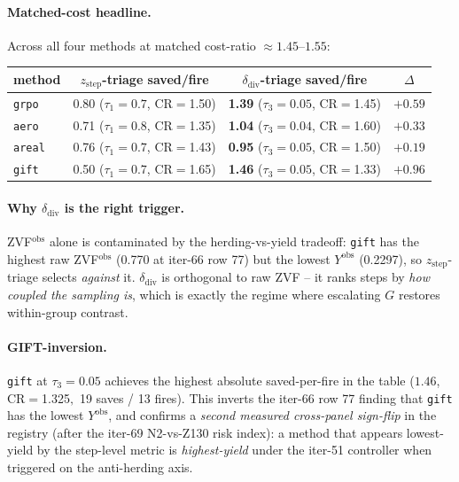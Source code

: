\paragraph{Matched-cost headline.}
Across all four methods at matched cost-ratio $\approx 1.45$--$1.55$:
\begin{center}
\begin{tabular}{lccc}
\toprule
method & $z_{\mathrm{step}}$-triage saved/fire & $\delta_{\mathrm{div}}$-triage saved/fire & $\Delta$ \\
\midrule
\texttt{grpo}  & 0.80 ($\tau_1{=}0.7$, CR$=$1.50) & \textbf{1.39} ($\tau_3{=}0.05$, CR$=$1.45) & $+0.59$ \\
\texttt{aero}  & 0.71 ($\tau_1{=}0.8$, CR$=$1.35) & \textbf{1.04} ($\tau_3{=}0.04$, CR$=$1.60) & $+0.33$ \\
\texttt{areal} & 0.76 ($\tau_1{=}0.7$, CR$=$1.43) & \textbf{0.95} ($\tau_3{=}0.05$, CR$=$1.50) & $+0.19$ \\
\texttt{gift}  & 0.50 ($\tau_1{=}0.7$, CR$=$1.65) & \textbf{1.46} ($\tau_3{=}0.05$, CR$=$1.33) & $+0.96$ \\
\bottomrule
\end{tabular}
\end{center}

\paragraph{Why $\delta_{\mathrm{div}}$ is the right trigger.}
ZVF$^{\mathrm{obs}}$ alone is contaminated by the herding-vs-yield
tradeoff: \texttt{gift} has the highest raw ZVF$^{\mathrm{obs}}$ (0.770
at iter-66 row 77) but the lowest $Y^{\mathrm{obs}}$ (0.2297), so
$z_{\mathrm{step}}$-triage selects \emph{against} it.
$\delta_{\mathrm{div}}$ is orthogonal to raw ZVF -- it ranks steps by
\emph{how coupled the sampling is}, which is exactly the regime where
escalating $G$ restores within-group contrast.

\paragraph{GIFT-inversion.}
\texttt{gift} at $\tau_3{=}0.05$ achieves the highest absolute
saved-per-fire in the table ($1.46$, CR$=$1.325$,$ 19 saves / 13 fires).
This inverts the iter-66 row 77 finding that \texttt{gift} has the lowest
$Y^{\mathrm{obs}}$, and confirms a \emph{second measured cross-panel
sign-flip} in the registry (after the iter-69 N2-vs-Z130 risk index):
a method that appears lowest-yield by the step-level metric is
\emph{highest-yield} under the iter-51 controller when triggered on the
anti-herding axis.

